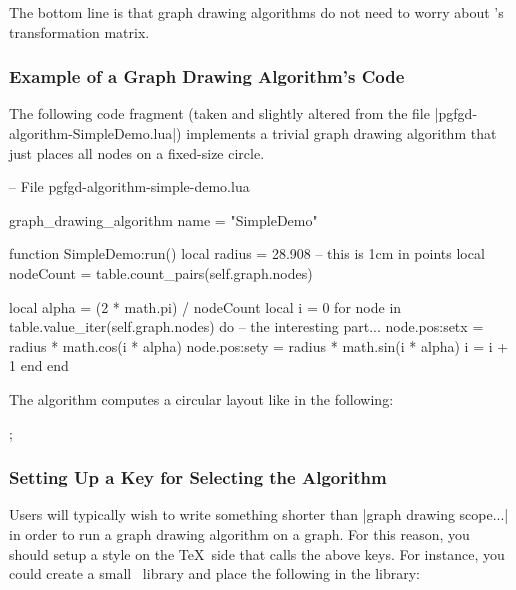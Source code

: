 The bottom line is that graph drawing algorithms do not need to worry
about \pgfname's transformation matrix.



\subsubsection{Example of a Graph Drawing Algorithm's Code}

The following code fragment (taken and slightly altered
from the file |pgfgd-algorithm-SimpleDemo.lua|)
implements a trivial graph drawing algorithm that just places all
nodes on a fixed-size circle.  



\begin{codeexample}
-- File pgfgd-algorithm-simple-demo.lua
  
graph_drawing_algorithm { name = "SimpleDemo" }

function SimpleDemo:run()
   local radius = 28.908  -- this is 1cm in points
   local nodeCount = table.count_pairs(self.graph.nodes)

   local alpha = (2 * math.pi) / nodeCount
   local i = 0
   for node in table.value_iter(self.graph.nodes) do
      -- the interesting part...
      node.pos:set{x = radius * math.cos(i * alpha)}
      node.pos:set{y = radius * math.sin(i * alpha)}
      i = i + 1
   end
end
\end{codeexample}

The algorithm computes a circular layout like in the following:

\begin{codeexample}[]
\tikz [graph drawing scope, /graph drawing/algorithm=Simple Demo]
  ;
\end{codeexample}


\subsubsection{Setting Up a Key for Selecting the Algorithm}

Users will typically wish to write something shorter than
|graph drawing scope...| in order to run a graph drawing algorithm on
a graph. For this reason, you should setup a style on the \TeX\ side
that calls the above keys. For instance, you could create a small
\tikzname\ library and place the following in the library:

